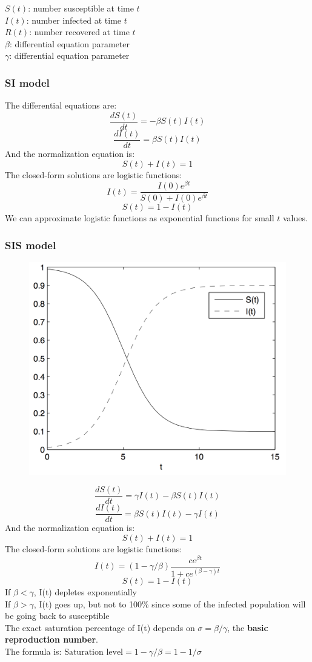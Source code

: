 \documentclass{article}
\begin{document}
$S(t)$: number susceptible at time $t$ \\
$I(t)$: number infected at time $t$ \\
$R(t)$: number recovered at time $t$ \\
$\beta$: differential equation parameter \\
$\gamma$: differential equation parameter

\subsubsection{SI model}

The differential equations are:
$$ \frac{dS(t)}{dt} = -\beta S(t) I(t) $$
$$ \frac{dI(t)}{dt} = \beta S(t) I(t) $$
And the normalization equation is:
$$ S(t) + I(t) = 1 $$
The closed-form solutions are logistic functions:
$$ I(t) = \frac{I(0)e^{\beta t}}{S(0) + I(0)e^{\beta t}} $$
$$ S(t) = 1 - I(t) $$
We can approximate logistic functions as exponential functions for small $t$ values.

\subsubsection{SIS model}

\begin{figure}
\includegraphics[width=\linewidth]{SIS.png}
\end{figure}

$$\frac{dS(t)}{dt} = \gamma I(t) - \beta S(t) I(t) $$
$$ \frac{dI(t)}{dt} = \beta S(t) I(t) - \gamma I(t) $$
And the normalization equation is:
$$ S(t) + I(t) = 1 $$
The closed-form solutions are logistic functions:
$$ I(t) = (1-\gamma/\beta)\frac{ce^{\beta t}}{1 + ce^{(\beta - \gamma) t}} $$
$$ S(t) = 1 - I(t) $$
If $\beta < \gamma$, I(t) depletes exponentially \\
If $\beta > \gamma$, I(t) goes up, but not to 100\% since some of the infected population will be going back to susceptible \\
The exact saturation percentage of I(t) depends on $\sigma = \beta/\gamma$, the \textbf{basic reproduction number}. \\
The formula is: $\text{Saturation level} = 1-\gamma/\beta = 1-1/\sigma$
\end{document}
